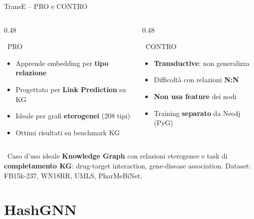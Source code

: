 \documentclass[aspectratio=169]{beamer}
\newcommand{\icoThumb}{\faThumbsUp}
\newcommand{\icoWarn}{\faExclamationTriangle}
\newcommand{\icoIdea}{\faLightbulb}
\newcommand{\icoCheck}{\faCheckCircle}
\newcommand{\icoX}{\faTimesCircle}
\newcommand{\icoThumb}{\textbf{+}}
\newcommand{\icoWarn}{\textbf{!}}
\newcommand{\icoIdea}{\textbf{$\bigstar$}}
\newcommand{\icoCheck}{\ding{52}}
\newcommand{\icoX}{\ding{56}}
\newcommand{\pro}{{\color{successGreen}\icoCheck}}
\newcommand{\con}{{\color{warningRed}\icoX}}
\begin{document}
\begin{frame}{TransE -- PRO e CONTRO}
  \begin{columns}[T]
    \begin{column}{0.48\textwidth}
      \begin{block}{\icoThumb\ PRO}
        \footnotesize
        \begin{itemize}
          \setlength{\itemsep}{1pt}
          \setlength{\parskip}{0pt}
          \item[\pro] Apprende embedding per \textbf{tipo relazione}
          \item[\pro] Progettato per \textbf{Link Prediction} su KG
          \item[\pro] Ideale per grafi \textbf{eterogenei} (208 tipi)
          \item[\pro] Ottimi risultati su benchmark KG
        \end{itemize}
      \end{block}
    \end{column}
    \begin{column}{0.48\textwidth}
      \begin{alertblock}{\icoWarn\ CONTRO}
        \footnotesize
        \begin{itemize}
          \setlength{\itemsep}{1pt}
          \setlength{\parskip}{0pt}
          \item[\con] \textbf{Transductive}: non generalizza
          \item[\con] Difficolt\`a con relazioni \textbf{N:N}
          \item[\con] \textbf{Non usa feature} dei nodi
          \item[\con] Training \textbf{separato} da Neo4j (PyG)
        \end{itemize}
      \end{alertblock}
    \end{column}
  \end{columns}
  \vspace{-0.1cm}
  \begin{exampleblock}{\icoIdea\ Caso d'uso ideale}
    \footnotesize
    \textbf{Knowledge Graph} con relazioni eterogenee e task di \textbf{completamento KG}:
    drug-target interaction, gene-disease association.
    Dataset: FB15k-237, WN18RR, UMLS, PharMeBiNet.
  \end{exampleblock}
\end{frame}

\section{HashGNN}
\end{document}

